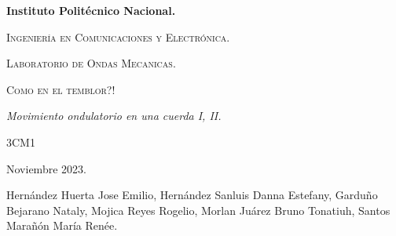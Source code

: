 \documentclass[10pt]{article}
\begin{document}
\pagestyle{fancy}
\cfoot{}


\lhead{}

\begin{titlepage}

	\begin{figure}[t]
		\hspace{0.6\textwidth}
	\end{figure}

	\centering
	{\bfseries\Huge Instituto Politécnico Nacional. \par}
	\vspace{1cm}
	{\scshape\Large Ingeniería en Comunicaciones y Electrónica. \par}
	\vspace{0.3cm}
	{\scshape\Large Laboratorio de Ondas Mecanicas.  \par}
	\vspace{1cm}
	{\scshape\Huge Como en el temblor?! \par}
	\vspace{1cm}
	{\itshape\Large Movimiento ondulatorio en una cuerda I, II. \par}
	{\Large 3CM1\par}
	\vfill
	
	\vfill
	{\Large Noviembre 2023. \par}

\end{titlepage}

\tableofcontents
\newpage
\begin{center}
	Hernández Huerta Jose Emilio, 
	Hernández Sanluis Danna Estefany,  
	Garduño Bejarano Nataly,
	Mojica Reyes Rogelio,
	Morlan Juárez Bruno Tonatiuh,  
	Santos Marañón María Renée.
\end{center}
\end{document}
